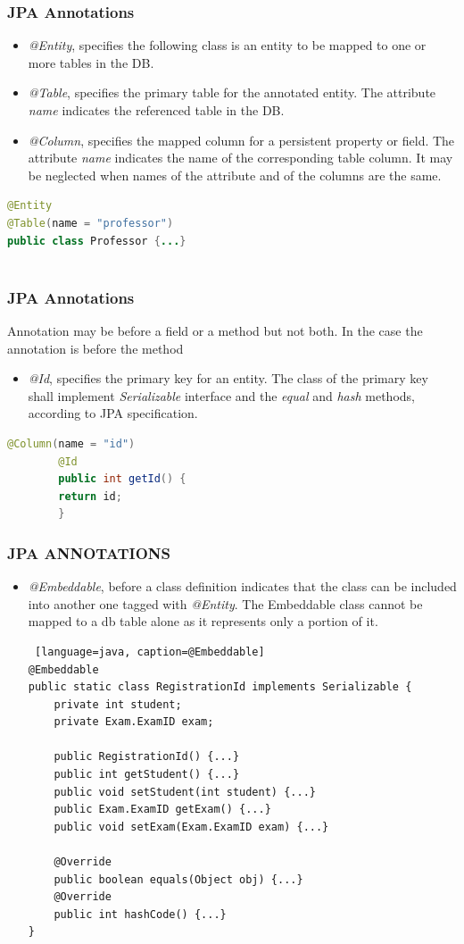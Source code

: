 \documentclass{beamer}
\begin{document}
\begin{frame} [fragile]
\frametitle{JPA Annotations}
\begin{itemize}
\item \textit{@Entity}, specifies the following class is an entity to be mapped to one or more tables in the DB.
\item \textit{@Table}, specifies the primary table for the annotated entity. The attribute \textit{name} indicates the referenced table in the DB.
\item \textit{@Column}, specifies the mapped column for a persistent property or field. The attribute \textit{name} indicates the name of the corresponding table column. It may be neglected when names of the attribute and of the columns are the same.
\end{itemize}
\begin{lstlisting}[language=Java, caption=@Entity and @Table]
@Entity
@Table(name = "professor")
public class Professor {...}
	
\end{lstlisting}
\end{frame}

\begin{frame}[fragile]
	\frametitle{JPA Annotations}
	Annotation may be before a field or a method but not both. In the case the annotation is before the method
	\begin{itemize}
		\item \textit{@Id}, specifies the primary key for an entity. The class of the primary key shall implement \textit{Serializable} interface and the \textit{equal} and \textit{hash} methods, according to JPA specification.
	\end{itemize}
	\begin{lstlisting}[language=java, caption=@Id @Column and @GeneratedValue]
		@Column(name = "id")
		@Id
		public int getId() {
		return id;
		}
	\end{lstlisting}
\end{frame}

\begin{frame} [fragile]
	\frametitle{JPA ANNOTATIONS}
	\begin{itemize}
		\item \textit{@Embeddable}, before a class definition indicates that the class can be included into another one tagged with \textit{@Entity}. The Embeddable class cannot be mapped to a db table alone as it represents only a portion of it.
		\begin{lstlisting} [language=java, caption=@Embeddable]
@Embeddable
public static class RegistrationId implements Serializable {
	private int student;
	private Exam.ExamID exam;
	
	public RegistrationId() {...}	
	public int getStudent() {...}
	public void setStudent(int student) {...}
	public Exam.ExamID getExam() {...}
	public void setExam(Exam.ExamID exam) {...}
		
	@Override
	public boolean equals(Object obj) {...}		
	@Override
	public int hashCode() {...}
}
		\end{lstlisting}
	\end{itemize}
\end{frame}
\end{document}
